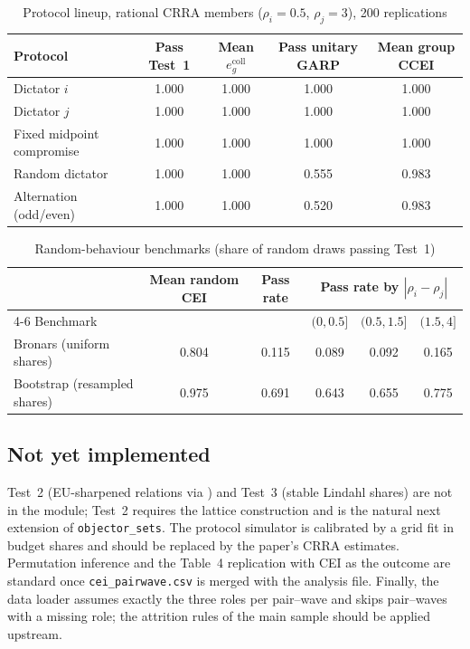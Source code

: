 \documentclass[11pt]{article}
\theoremstyle{remark}
\begin{document}
\begin{table}[htbp]\centering
\caption{Protocol lineup, rational CRRA members ($\rho_i=0.5$, $\rho_j=3$), 200 replications}\label{tab:lineup}
\begin{tabular}{lcccc}\toprule
Protocol & Pass Test~1 & Mean $e^{\mathrm{coll}}_g$ & Pass unitary GARP & Mean group CCEI\\\midrule
Dictator $i$ & 1.000 & 1.000 & 1.000 & 1.000\\
Dictator $j$ & 1.000 & 1.000 & 1.000 & 1.000\\
Fixed midpoint compromise & 1.000 & 1.000 & 1.000 & 1.000\\
Random dictator & 1.000 & 1.000 & 0.555 & 0.983\\
Alternation (odd/even) & 1.000 & 1.000 & 0.520 & 0.983\\\bottomrule
\end{tabular}
\end{table}

\begin{table}[htbp]\centering
\caption{Random-behaviour benchmarks (share of random draws passing Test~1)}\label{tab:power}
\begin{tabular}{lccccc}\toprule
& Mean random CEI & Pass rate & \multicolumn{3}{c}{Pass rate by $|\rho_i-\rho_j|$}\\
\cmidrule(lr){4-6}
Benchmark & & & $(0,0.5]$ & $(0.5,1.5]$ & $(1.5,4]$\\\midrule
Bronars (uniform shares) & 0.804 & 0.115 & 0.089 & 0.092 & 0.165\\
Bootstrap (resampled shares) & 0.975 & 0.691 & 0.643 & 0.655 & 0.775\\\bottomrule
\end{tabular}
\end{table}

\subsection{Not yet implemented}

Test~2 (EU-sharpened relations via \citealp{polisson2020}) and Test~3 (stable Lindahl shares) are not in the module; Test~2 requires the lattice construction and is the natural next extension of \texttt{objector\_sets}. The protocol simulator is calibrated by a grid fit in budget shares and should be replaced by the paper's CRRA estimates. Permutation inference and the Table~4 replication with CEI as the outcome are standard once \texttt{cei\_pairwave.csv} is merged with the analysis file. Finally, the data loader assumes exactly the three roles per pair--wave and skips pair--waves with a missing role; the attrition rules of the main sample should be applied upstream.
\end{document}
